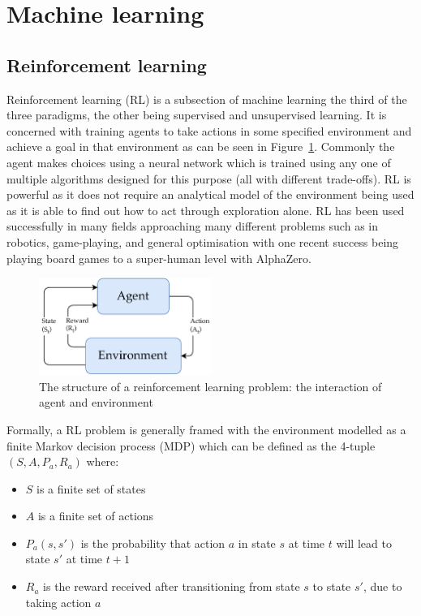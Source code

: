 \section{Machine learning}

\subsection{Reinforcement learning}

Reinforcement learning (RL)\cite{sutton2018reinforcement} is a subsection of machine learning the third of the three paradigms, the other being supervised and unsupervised learning. It is concerned with training agents to take actions in some specified environment and achieve a goal in that environment as can be seen in Figure~\ref{fig:reinforcement_learning}. Commonly the agent makes choices using a neural network which is trained using any one of multiple algorithms designed for this purpose (all with different trade-offs). RL is powerful as it does not require an analytical model of the environment being used as it is able to find out how to act through exploration alone. RL has been used successfully in many fields approaching many different problems such as in robotics\cite{}, game-playing\cite{},  and general optimisation with one recent success being playing board games to a super-human level with AlphaZero\cite{Silver1140}.

\begin{figure}
    \centering
    \includegraphics[width=0.5\textwidth]{figures/reinforcement_learning.pdf}
    \caption{The structure of a reinforcement learning problem: the interaction of agent and environment}
    \label{fig:reinforcement_learning}
\end{figure}

Formally, a RL problem is generally framed with the environment modelled as a finite Markov decision process (MDP) which can be defined as the 4-tuple $(S, A, P_a, R_a)$ where:
\begin{itemize}
    \item $S$ is a finite set of states
    \item $A$ is a finite set of actions
    \item $P_a(s,s')$ is the probability that action $a$ in state $s$ at time $t$ will lead to state $s'$ at time $t + 1$
    \item $R_a$ is the reward received after transitioning from state $s$ to state $s'$, due to taking action $a$
\end{itemize}

